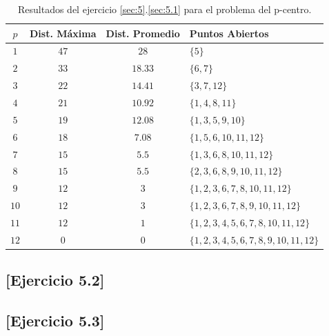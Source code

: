 \documentclass[spanish]{article}
\begin{document}
			\begin{table}[h]
				\begin{center}
					\begin{tabular}{|c || c || c || l | }
						\hline
						$p$		& Dist. Máxima 	& Dist. Promedio	& Puntos Abiertos	 \\ \hline \hline
						$1$ 	& $47$ 					& $28$						& $\{5\}$ \\ \hline
						$2$ 	& $33$ 					& $18.33$					& $\{6,7\}$ \\ \hline
						$3$ 	& $22$ 					& $14.41$					& $\{3,7,12\}$ \\ \hline
						$4$ 	& $21$ 					& $10.92$					& $\{1,4,8,11\}$ \\ \hline
						$5$ 	& $19$ 					& $12.08$					& $\{1,3,5,9,10\}$ \\ \hline
						$6$ 	& $18$ 					& $7.08$					& $\{1,5,6,10,11,12 \}$ \\ \hline
						$7$ 	& $15$ 					& $5.5$						& $\{1,3,6,8,10,11,12\}$ \\ \hline
						$8$ 	& $15$ 					& $5.5$						& $\{2,3,6,8,9,10,11,12\}$ \\ \hline
						$9$ 	& $12$ 					& $3$							& $\{1,2,3,6,7,8,10,11,12\}$ \\ \hline
						$10$ 	& $12$ 					& $3$							& $\{1,2,3,6,7,8,9,10,11,12\}$ \\ \hline
						$11$ 	& $12$ 					& $1$							& $\{1,2,3,4,5,6,7,8,10,11,12\}$ \\ \hline
						$12$ 	& $0$ 					& $0$							& $\{1,2,3,4,5,6,7,8,9,10,11,12\}$ \\
						\hline
					\end{tabular}
				\end{center}
				\caption{Resultados del ejercicio \ref{sec:5}.\ref{sec:5.1} para el problema del p-centro.}
				\label{table:sol-5.1center}
			\end{table}

		\subsection{[Ejercicio 5.2]}
		\label{sec:5.2}

			\paragraph{}


		\subsection{[Ejercicio 5.3]}
		\label{sec:5.3}

			\paragraph{}



	\nocite{subject:mio}
	
  
\end{document}
